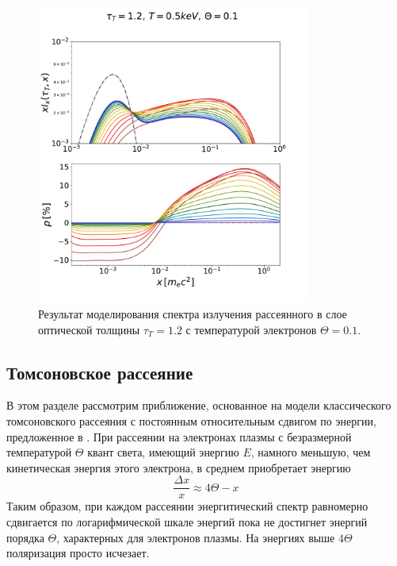 \documentclass[14pt,a4paper]{extarticle}
\newcommand{\be}{\begin{equation}}
\newcommand{\ee}{\end{equation}}
\begin{document}
			\newpage
			\begin{figure}[H]
				\centering
				\includegraphics[width=0.8\textwidth]{CM10zAll.pdf}
				\caption{\small
					Результат моделирования спектра излучения рассеянного в слое
					оптической толщины $\tau_T=1.2$ с температурой электронов $\Theta=0.1$. 
				}\label{fig:Comp1}
			\end{figure}
			\newpage





		\subsection{Томсоновское рассеяние}\label{sub:TS}
			В этом разделе рассмотрим приближение, основанное на модели классического томсоновского рассеяния с постоянным относительным сдвигом по энергии, предложенное в \cite{Viironen2004}.
			При рассеянии на электронах плазмы с безразмерной температурой $\Theta$ квант света, имеющий энергию $E$, намного меньшую, чем кинетическая энергия этого электрона, в среднем приобретает энергию \cite{Rybicki1979} \be\label{eq:energyshift}
				\frac{\Delta x}{x} \approx 4\Theta - x\ee %
			Таким образом, при каждом рассеянии энергитический спектр равномерно сдвигается по логарифмической шкале энергий пока не достигнет энергий порядка $\Theta$, характерных для электронов плазмы. На энергиях выше $4\Theta$ поляризация просто исчезает. 
\end{document}
